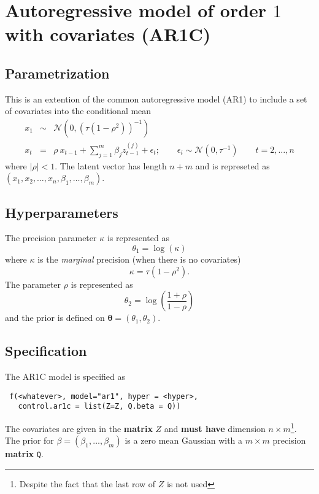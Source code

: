 \documentclass[a4paper,11pt]{article}
\begin{document}
\section*{Autoregressive model of order $1$ with covariates (AR1C)}

\subsection*{Parametrization}

This is an extention of the common autoregressive model (AR1) to
include a set of covariates into the conditional mean
\begin{eqnarray}\nonumber
  x_1&\sim&\mathcal{N}(0,(\tau(1-\rho^2))^{-1}) \\\nonumber
  x_t&=&\rho\ x_{t-1}+ \sum_{j=1}^{m} \beta_j z^{(j)}_{t-1} +
         \epsilon_t; \qquad \epsilon_i\sim\mathcal{N}(0,\tau^{-1}) \qquad  t=2,\dots,n
\end{eqnarray}
where $|\rho|<1$. The latent vector has length $n+m$ and is represeted
as $(x_1, x_2, \ldots, x_n, \beta_1, \ldots, \beta_m)$.


\subsection*{Hyperparameters}

The precision parameter $\kappa$ is represented as
\begin{displaymath}
    \theta_1 =\log(\kappa) 
\end{displaymath}
where $\kappa$ is the \emph{marginal} precision (when there is no covariates)
\begin{displaymath}
    \kappa = \tau (1-\rho^{2}).
\end{displaymath}
The parameter $\rho$ is represented as
\[
\theta_2 = \log\left(\frac{1+\rho}{1-\rho}\right)
\]
and the prior is defined on $\mathbf{\theta}=(\theta_1,\theta_2)$. 

\subsection*{Specification}

The AR1C model is specified as
\begin{verbatim}
 f(<whatever>, model="ar1", hyper = <hyper>,
   control.ar1c = list(Z=Z, Q.beta = Q))
\end{verbatim}
The covariates are given in the \textbf{matrix} $Z$ and \textbf{must
    have} dimension $n\times m$\footnote{Despite the fact that the
    last row of $Z$ is not used}. The prior for
$\beta = (\beta_1, \ldots, \beta_m)$ is a zero mean Gaussian with a
$m\times m$ precision \textbf{matrix} \texttt{Q}.
\end{document}
